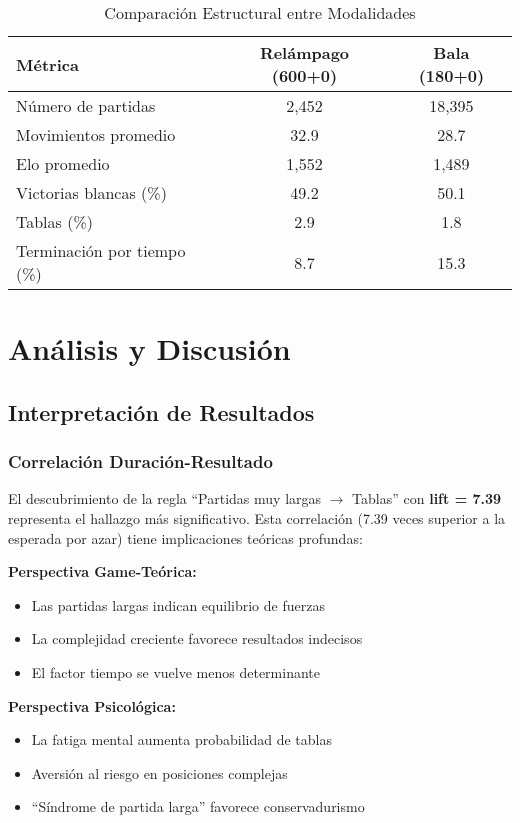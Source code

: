 \documentclass[11pt,a4paper]{article}
\begin{document}
\begin{table}[H]
\centering
\caption{Comparaci\'on Estructural entre Modalidades}
\label{tab:comparison}
\begin{tabular}{@{}lcc@{}}
\toprule
\textbf{M\'etrica} & \textbf{Rel\'ampago (600+0)} & \textbf{Bala (180+0)} \\
\midrule
N\'umero de partidas & 2,452 & 18,395 \\
Movimientos promedio & 32.9 & 28.7 \\
Elo promedio & 1,552 & 1,489 \\
Victorias blancas (\%) & 49.2 & 50.1 \\
Tablas (\%) & 2.9 & 1.8 \\
Terminaci\'on por tiempo (\%) & 8.7 & 15.3 \\
\bottomrule
\end{tabular}
\end{table}

\section{An\'alisis y Discusi\'on}

\subsection{Interpretaci\'on de Resultados}

\subsubsection{Correlaci\'on Duraci\'on-Resultado}

El descubrimiento de la regla ``Partidas muy largas $\rightarrow$ Tablas'' con \textbf{lift = 7.39} representa el hallazgo m\'as significativo. Esta correlaci\'on (7.39 veces superior a la esperada por azar) tiene implicaciones te\'oricas profundas:

\textbf{Perspectiva Game-Te\'orica:}
\begin{itemize}
\item Las partidas largas indican equilibrio de fuerzas
\item La complejidad creciente favorece resultados indecisos
\item El factor tiempo se vuelve menos determinante
\end{itemize}

\textbf{Perspectiva Psicol\'ogica:}
\begin{itemize}
\item La fatiga mental aumenta probabilidad de tablas
\item Aversi\'on al riesgo en posiciones complejas
\item ``S\'indrome de partida larga'' favorece conservadurismo
\end{itemize}
\end{document}
